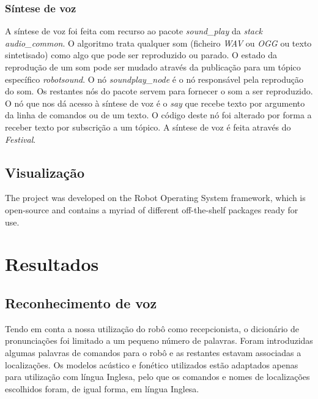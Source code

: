 \documentclass[journal]{IEEEtran}
\begin{document}
\subsubsection{Síntese de voz}

A síntese de voz foi feita com recurso ao pacote \textit{sound\_play} da \textit{stack} \textit{audio\_common}. O algoritmo trata qualquer som (ficheiro \emph{WAV} ou \emph{OGG} ou texto sintetisado) como algo que pode ser reproduzido ou parado. O estado da reprodução de um som pode ser mudado através da publicação para um tópico específico \textit{robotsound}. O nó \textit{soundplay\_node} é o nó responsável pela reprodução do som. Os restantes nós do pacote servem para fornecer o som a ser reproduzido. O nó que nos dá acesso à síntese de voz é o \textit{say} que recebe texto por argumento da linha de comandos ou de um texto. O código deste nó foi alterado por forma a receber texto por subscrição a um tópico. A síntese de voz é feita através do \emph{Festival}.

\subsection{Visualização}


The project was developed on the Robot Operating System framework, which is open-source and contains a myriad of different off-the-shelf packages ready for use.

\section{Resultados}

\subsection{Reconhecimento de voz}
\label{sec:resuts_recvoice}

Tendo em conta a nossa utilização do robô como recepcionista, o dicionário de pronunciações foi limitado a um pequeno número de palavras. Foram introduzidas algumas palavras de comandos para o robô e as restantes estavam associadas a localizações. Os modelos acústico e fonético utilizados estão adaptados apenas para utilização com língua Inglesa, pelo que os comandos e nomes de localizações escolhidos foram, de igual forma, em língua Inglesa.
\end{document}
